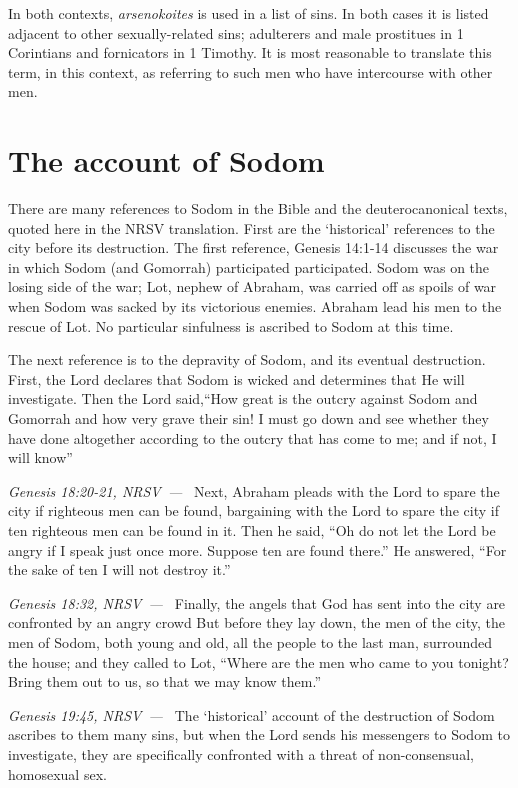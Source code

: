 \documentclass[10pt]{article}
\let\oldquote\quote
\let\endoldquote\endquote
\renewenvironment{quote}[2][]
  {\if\relax\detokenize{#1}\relax
     \def\quoteauthor{#2}%
   \else
     \def\quoteauthor{#2~---~#1}%
   \fi
   \oldquote}
  {\par\nobreak\smallskip\hfill\textit{\quoteauthor}%
   \endoldquote\addvspace{\bigskipamount}}
\begin{document}
In both contexts, \textit{arsenokoites} is used in a list of sins. In both cases it is listed adjacent to other sexually-related sins; adulterers and male prostitues in 1 Corintians and fornicators in 1 Timothy. It is most reasonable to translate this term, in this context, as referring to such men who have intercourse with other men. 

\section*{The account of Sodom}

There are many references to Sodom in the Bible and the deuterocanonical texts, quoted here in the NRSV translation. First are the `historical' references to the city before its destruction. The first reference, Genesis 14:1-14 discusses the war in which Sodom (and Gomorrah) participated participated. Sodom was on the losing side of the war; Lot, nephew of Abraham, was carried off as spoils of war when Sodom was sacked by its victorious enemies. Abraham lead his men to the rescue of Lot. No particular sinfulness is ascribed to Sodom at this time. 

The next reference is to the depravity of Sodom, and its eventual destruction. First, the Lord declares that Sodom is wicked and determines that He will investigate.
\begin{quote}{Genesis 18:20-21, NRSV}
Then the Lord said,``How great is the outcry against Sodom and Gomorrah and how very grave their sin! I must go down and see whether they have done altogether according to the outcry that has come to me; and if not, I will know''
\end{quote}
Next, Abraham pleads with the Lord to spare the city if righteous men can be found, bargaining with the Lord to spare the city if ten righteous men can be found in it.
\begin{quote}{Genesis 18:32, NRSV}
Then he said, ``Oh do not let the Lord be angry if I speak just once more. Suppose ten are found there.” He answered, “For the sake of ten I will not destroy it.''
\end{quote}
Finally, the angels that God has sent into the city are confronted by an angry crowd
\begin{quote}{Genesis 19:45, NRSV}
But before they lay down, the men of the city, the men of Sodom, both young and old, all the people to the last man, surrounded the house; and they called to Lot, ``Where are the men who came to you tonight? Bring them out to us, so that we may know them.''
\end{quote}
The `historical' account of the destruction of Sodom ascribes to them many sins, but when the Lord sends his messengers to Sodom to investigate, they are specifically confronted with a threat of non-consensual, homosexual sex. 
\end{document}
